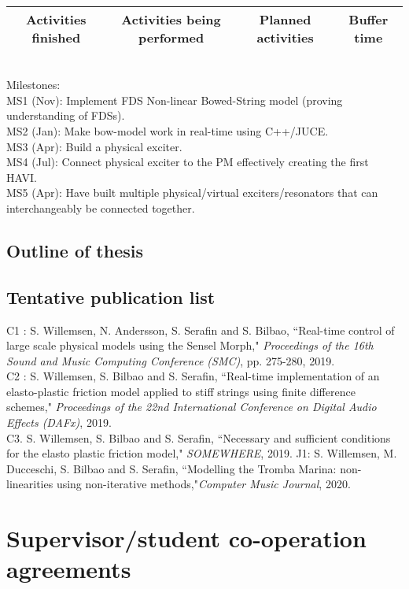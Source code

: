 \vspace{0.3cm}
\\
\begin{tabular}[h]{|c|c|c|c|}
\hline
\cellcolor{green} Activities finished & \cellcolor{yellow} Activities being performed & \cellcolor{red} Planned activities & \cellcolor{lighterblue} Buffer time\\
\hline
\end{tabular}
\vspace{0.3cm}
\\
\normalsize
Milestones:
\\
MS1 (Nov): Implement FDS Non-linear Bowed-String model (proving understanding of FDSs).\\
MS2 (Jan): Make bow-model work in real-time using C++/JUCE.\\
MS3 (Apr): Build a physical exciter.\\
MS4 (Jul): Connect physical exciter to the PM effectively creating the first HAVI.\\
MS5 (Apr): Have built multiple physical/virtual exciters/resonators that can interchangeably be connected together.

\subsection{Outline of thesis}
\subsection{Tentative publication list}
C1 \cite{Willemsen2019a}: S. Willemsen, N. Andersson, S. Serafin and S. Bilbao, ``Real-time control of large scale physical models using the Sensel Morph," \textit{Proceedings of the 16th Sound and Music Computing Conference (SMC)}, pp. 275-280, 2019.
\\
C2 \cite{Willemsen2019b}: S. Willemsen, S. Bilbao and S. Serafin, ``Real-time implementation of an elasto-plastic friction model applied to stiff strings using finite difference schemes," \textit{Proceedings of the 22nd International Conference on Digital Audio Effects (DAFx)}, 2019.
\\
C3. S. Willemsen, S. Bilbao and S. Serafin, ``Necessary and sufficient conditions for the elasto plastic friction model," \textit{SOMEWHERE}, 2019.
J1: S. Willemsen, M. Ducceschi, S. Bilbao and S. Serafin, ``Modelling the Tromba Marina: non-linearities using non-iterative methods,"\textit{Computer Music Journal}, 2020.
\\
\section{Supervisor/student co-operation agreements}

